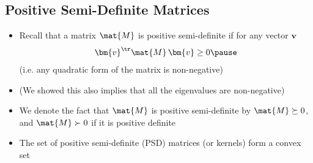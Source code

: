 
\begin{slide}
\section[-2]{Positive Semi-Definite Matrices}

\begin{PauseHighLight}
  \begin{itemize}
  \item Recall that a matrix $\mat{M}$ is positive semi-definite if for any
    vector $\bm{v}$
    \begin{align*}
      \bm{v}^\tr \mat{M}\,\bm{v} \geq 0\pause
    \end{align*}
    (i.e.{} any quadratic form of the matrix is non-negative)\pauseb
  \item (We showed this also implies that all the eigenvalues are
    non-negative)\pause
  \item We denote the fact that $\mat{M}$ is positive semi-definite by
    $\mat{M}\succeq0$, and $\mat{M} \succ 0$ if it is positive definite\pause
  \item The set of positive semi-definite (PSD) matrices (or kernels) form a
    convex set\pause
  \end{itemize}
\end{PauseHighLight}


\end{slide}


